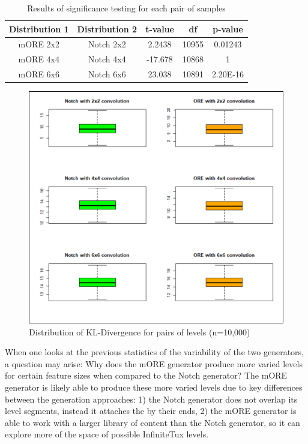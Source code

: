 \begin{table}[ht]
\centering
\begin{tabular}{| c | c | c | c | c |}\hline
Distribution 1 & Distribution 2 & t-value & df & p-value \\\hline
mORE 2x2 & Notch 2x2 & 2.2438 & 10955 & 0.01243 \\\hline
mORE 4x4 & Notch 4x4 & -17.678 & 10868 & 1 \\\hline
mORE 6x6 & Notch 6x6 & 23.038 & 10891 & 2.20E-16 \\\hline
\end{tabular}
\caption{Results of significance testing for each pair of samples}
\label{table:t-test}
\end{table}

\begin{figure}[ht]
    \centering
    \includegraphics[width=\linewidth]{img/fig16-boxplot.png}
    \caption{Distribution of KL-Divergence for pairs of levels (n=10,000)}
    \label{fig:boxplot}
\end{figure}

When one looks at the previous statistics of the variability of the two generators, a
question may arise: Why does the mORE generator produce more varied levels for certain
feature sizes when compared to the Notch generator? The mORE generator is likely able to 
produce these more varied levels due to key differences between the generation approaches:
1) the Notch generator does not overlap its level segments, instead it attaches the by
their ends, 2) the mORE generator is able to work with a larger library of content than the
Notch generator, so it can explore more of the space of possible InfiniteTux levels.

